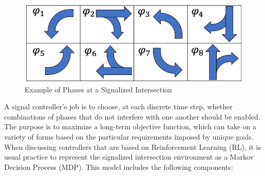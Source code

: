 \begin{figure}[h]
  \centering
  \includegraphics[width=0.6\linewidth]{images/background/intersection_phase.png}
  \caption{Example of Phases at a Signalized Intersection\cite{resco}}
  \label{fig:intersection-phase}
\end{figure}

A signal controller's job is to choose, at each discrete time step, whether combinations of phases that do not interfere with one another should be enabled. The purpose is to maximize a long-term objective function, which can take on a variety of forms based on the particular requirements imposed by unique goals. When discussing controllers that are based on Reinforcement Learning (RL), it is usual practice to represent the signalized intersection environment as a Markov Decision Process (MDP). This model includes the following components:

